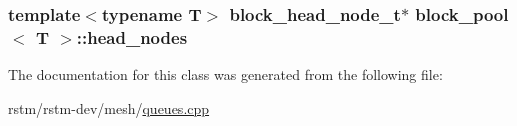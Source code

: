 \hypertarget{classblock__pool_a2889af47f657f2b2281c1fdbaaa8016a}{
\subsubsection[{head\-\_\-nodes}]{\setlength{\rightskip}{0pt plus 5cm}template$<$typename T$>$ {\bf block\-\_\-head\-\_\-node\-\_\-t}$\ast$ {\bf block\-\_\-pool}$<$ T $>$\-::head\-\_\-nodes\hspace{0.3cm}{\ttfamily [private]}}}\label{classblock__pool_a2889af47f657f2b2281c1fdbaaa8016a}


The documentation for this class was generated from the following file\-:\begin{DoxyCompactItemize}
\item 
rstm/rstm-\/dev/mesh/\hyperlink{queues_8cpp}{queues.\-cpp}\end{DoxyCompactItemize}
